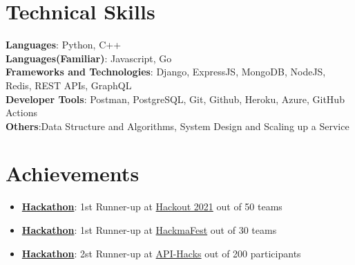\documentclass[letterpaper,11pt]{article}
\newcommand{\resumeItem}[1]{
  \item\small{
    {#1 \vspace{-2pt}}
  }
}
\newcommand{\resumeItemListStart}{\begin{itemize}}
\newcommand{\resumeItemListEnd}{\end{itemize}\vspace{-5pt}}
\begin{document}
%
\section{Technical Skills}
 \begin{itemize}[leftmargin=0.15in, label={}]
    \small{\item{
     \textbf{Languages}{: Python, C++} \\
      \textbf{Languages(Familiar)}{: Javascript, Go} \\
     \textbf{Frameworks and Technologies}{: Django, ExpressJS, MongoDB, NodeJS, Redis, REST APIs, GraphQL} \\
     \textbf{Developer Tools}{: Postman, PostgreSQL, Git, Github, Heroku, Azure, GitHub Actions} \\
     \textbf{Others}{:Data Structure and Algorithms, System Design and Scaling up a Service}\\
    }}
 \end{itemize}

\section{Achievements}
 \begin{itemize}[leftmargin=0.15in, label={}]
    \small{\item{
        \resumeItemListStart
                \resumeItem{\textbf{\href{Link if any}{Hackathon}}: 1st Runner-up at \href{https://www.hackout.io/}{Hackout 2021} out of 50 teams}
                \resumeItem{\textbf{\href{Link if any}{Hackathon}}: 1st Runner-up at \href{https://hackmafest.tech/}{HackmaFest} out of 30 teams}
                \resumeItem{\textbf{\href{Link if any}{Hackathon}}: 2st Runner-up at \href{https://apihacks.co/}{API-Hacks} out of 200 participants}
      \resumeItemListEnd
    }}
 \end{itemize}
\end{document}

